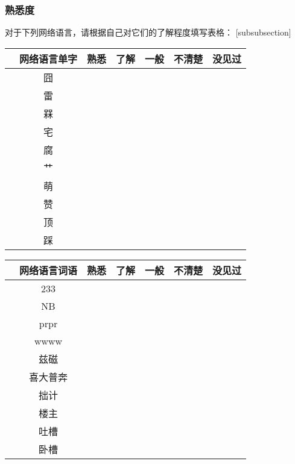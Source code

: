 \subsubsection{熟悉度}

对于下列网络语言，请根据自己对它们的了解程度填写表格：
[subsubsection]
\newcommand\ii{\stepcounter{thei}\arabic{thei}}
\begin{longtable}{|c|c|c|c|c|c|c|}
\hline& 网络语言单字 & 熟悉 & 了解 & 一般 & 不清楚 & 没见过\\\hline
\ii & 囧 &  &  &  &  & \\\hline
\ii & 雷 &  &  &  &  & \\\hline
\ii & 槑 &  &  &  &  & \\\hline
\ii & 宅 &  &  &  &  & \\\hline
\ii & 腐 &  &  &  &  & \\\hline
\ii & 艹 &  &  &  &  & \\\hline
\ii & 萌 &  &  &  &  & \\\hline
\ii & 赞 &  &  &  &  & \\\hline
\ii & 顶 &  &  &  &  & \\\hline
\ii & 踩 &  &  &  &  & \\\hline
\end{longtable}
\begin{longtable}{|c|c|c|c|c|c|c|}
\hline & 网络语言词语 & 熟悉 & 了解 & 一般 & 不清楚 & 没见过\\\hline
\ii & 233 &  &  &  &  & \\\hline
\ii & NB &  &  &  &  & \\\hline
\ii & prpr &  &  &  &  & \\\hline
\ii & wwww &  &  &  &  & \\\hline
\ii & 兹磁 &  &  &  &  & \\\hline
\ii & 喜大普奔 &  &  &  &  & \\\hline
\ii & 拙计 &  &  &  &  & \\\hline
\ii & 楼主 &  &  &  &  & \\\hline
\ii & 吐槽 &  &  &  &  & \\\hline
\ii & 卧槽 &  &  &  &  & \\\hline
\end{longtable}
